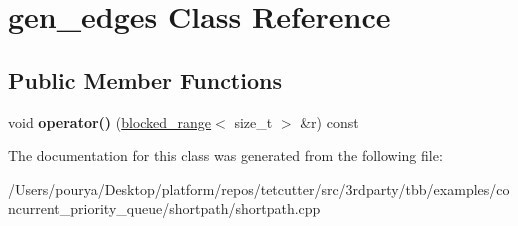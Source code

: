 \hypertarget{classgen__edges}{}\section{gen\+\_\+edges Class Reference}
\label{classgen__edges}
\subsection*{Public Member Functions}
\begin{DoxyCompactItemize}
\item 
\hypertarget{classgen__edges_ae5bb96ac296a5af76c6c6797dc266546}{}void {\bfseries operator()} (\hyperlink{classtbb_1_1blocked__range}{blocked\+\_\+range}$<$ size\+\_\+t $>$ \&r) const \label{classgen__edges_ae5bb96ac296a5af76c6c6797dc266546}

\end{DoxyCompactItemize}


The documentation for this class was generated from the following file\+:\begin{DoxyCompactItemize}
\item 
/\+Users/pourya/\+Desktop/platform/repos/tetcutter/src/3rdparty/tbb/examples/concurrent\+\_\+priority\+\_\+queue/shortpath/shortpath.\+cpp\end{DoxyCompactItemize}
